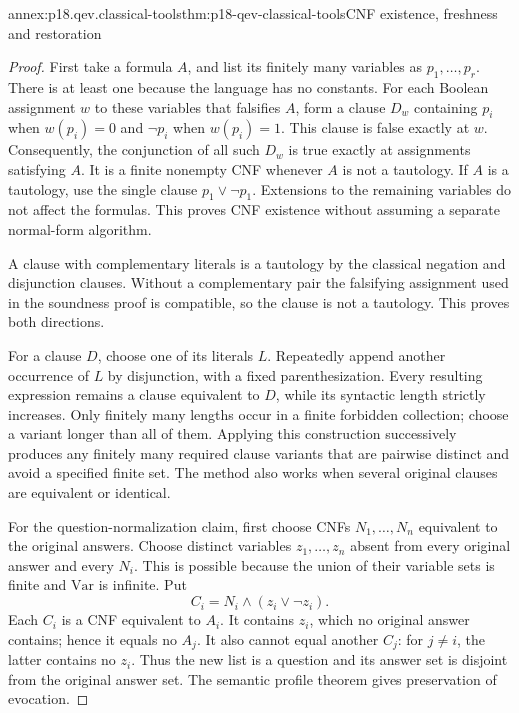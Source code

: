 \begin{annexitem}{annex:p18.qev.classical-tools}{thm:p18-qev-classical-tools}{CNF existence, freshness and restoration}
\begin{proof}
First take a formula \(A\), and list its finitely many variables as
\(p_1,\ldots,p_r\). There is at least one because the language has
no constants. For each Boolean assignment \(w\) to these variables
that falsifies \(A\), form a clause \(D_w\) containing \(p_i\)
when \(w(p_i)=0\) and \(\neg p_i\) when \(w(p_i)=1\).
This clause is false exactly at \(w\). Consequently, the conjunction
of all such \(D_w\) is true exactly at assignments satisfying \(A\).
It is a finite nonempty CNF whenever \(A\) is not a tautology.
If \(A\) is a tautology, use the single clause
\(p_1\lor\neg p_1\). Extensions to the remaining variables do
not affect the formulas. This proves CNF existence without assuming
a separate normal-form algorithm.

A clause with complementary literals is a tautology by the classical
negation and disjunction clauses. Without a complementary pair the
falsifying assignment used in the soundness proof is compatible, so
the clause is not a tautology. This proves both directions.

For a clause \(D\), choose one of its literals \(L\). Repeatedly
append another occurrence of \(L\) by disjunction, with a fixed
parenthesization. Every resulting expression remains a clause
equivalent to \(D\), while its syntactic length strictly increases.
Only finitely many lengths occur in a finite forbidden collection;
choose a variant longer than all of them. Applying this construction
successively produces any finitely many required clause variants that
are pairwise distinct and avoid a specified finite set. The method
also works when several original clauses are equivalent or identical.

For the question-normalization claim, first choose CNFs
\(N_1,\ldots,N_n\) equivalent to the original answers. Choose
distinct variables \(z_1,\ldots,z_n\) absent from every original
answer and every \(N_i\). This is possible because the union of their
variable sets is finite and \(\mathrm{Var}\) is infinite. Put
\[
 C_i=N_i\land(z_i\lor\neg z_i).
\]
Each \(C_i\) is a CNF equivalent to \(A_i\). It contains
\(z_i\), which no original answer contains; hence it equals no
\(A_j\). It also cannot equal another \(C_j\): for \(j\ne i\),
the latter contains no \(z_i\). Thus the new list is a question
and its answer set is disjoint from the original answer set.
The semantic profile theorem gives preservation of evocation.


\end{proof}
\end{annexitem}
